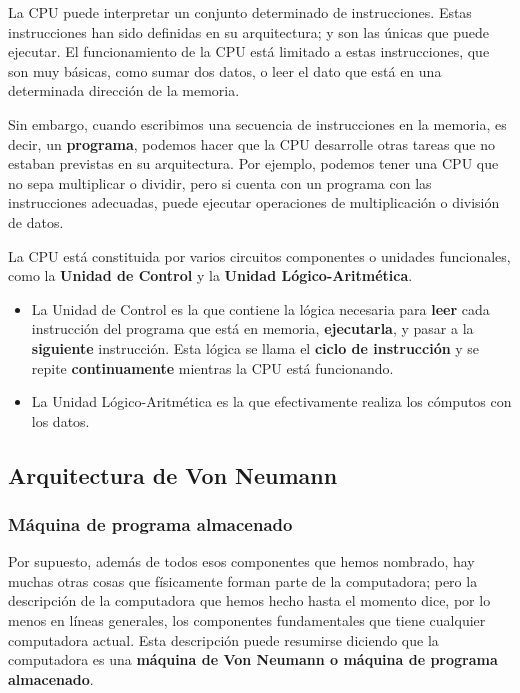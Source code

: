 \documentclass[spanish,A4,]{article}
\begin{document}
La CPU puede interpretar un conjunto determinado de instrucciones. Estas
instrucciones han sido definidas en su arquitectura; y son las únicas
que puede ejecutar. El funcionamiento de la CPU está limitado a estas
instrucciones, que son muy básicas, como sumar dos datos, o leer el dato
que está en una determinada dirección de la memoria.

Sin embargo, cuando escribimos una secuencia de instrucciones en la
memoria, es decir, un \textbf{programa}, podemos hacer que la CPU
desarrolle otras tareas que no estaban previstas en su arquitectura. Por
ejemplo, podemos tener una CPU que no sepa multiplicar o dividir, pero
si cuenta con un programa con las instrucciones adecuadas, puede
ejecutar operaciones de multiplicación o división de datos.

La CPU está constituida por varios circuitos componentes o unidades
funcionales, como la \textbf{Unidad de Control} y la \textbf{Unidad
Lógico-Aritmética}.

\begin{itemize}
\itemsep1pt\parskip0pt
\item
  La Unidad de Control es la que contiene la lógica necesaria para
  \textbf{leer} cada instrucción del programa que está en memoria,
  \textbf{ejecutarla}, y pasar a la \textbf{siguiente} instrucción. Esta
  lógica se llama el \textbf{ciclo de instrucción} y se repite
  \textbf{continuamente} mientras la CPU está funcionando.
\item
  La Unidad Lógico-Aritmética es la que efectivamente realiza los
  cómputos con los datos.
\end{itemize}

\subsection{Arquitectura de Von
Neumann}\label{arquitectura-de-von-neumann}

\subsubsection{Máquina de programa
almacenado}\label{muxe1quina-de-programa-almacenado}

Por supuesto, además de todos esos componentes que hemos nombrado, hay
muchas otras cosas que físicamente forman parte de la computadora; pero
la descripción de la computadora que hemos hecho hasta el momento dice,
por lo menos en líneas generales, los componentes fundamentales que
tiene cualquier computadora actual. Esta descripción puede resumirse
diciendo que la computadora es una \textbf{máquina de Von Neumann o
máquina de programa almacenado}.
\end{document}
